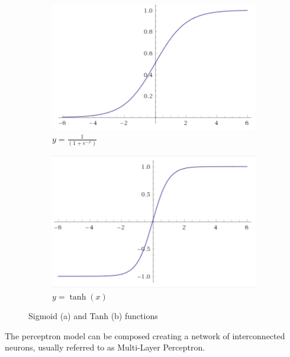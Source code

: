\documentclass[../main.tex]{subfiles}
\begin{document}
\begin{figure}[h!]
    \centering
    \begin{subfigure}[]{0.4\textwidth}
        \includegraphics[width=\linewidth]{images/SigmoidFunction.png}
        \caption{$ {y = \frac{1}{(1+e^{-x})}} $}
        \label{fig:Sigmoid}
    \end{subfigure}
    \hspace{1cm}
    \begin{subfigure}[]{0.4\textwidth}
        \includegraphics[width=\linewidth]{images/TanhFunction.png}
        \caption{$ {y = \tanh(x)} $}
        \label{fig:Tanh}
    \end{subfigure}
    \caption{Sigmoid (a) and Tanh (b) functions}
    \label{fig:SigmoidTanh}
\end{figure}


The perceptron model can be composed creating a network of interconnected neurons, usually referred to as Multi-Layer Perceptron.
\end{document}
